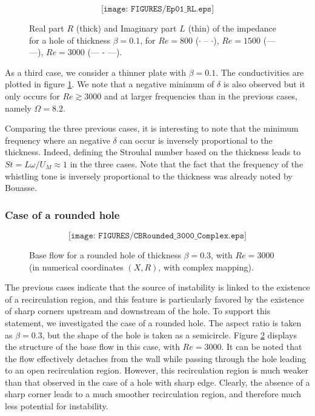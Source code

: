 \documentclass{jfm}
\begin{document}
\begin{figure}
$$
\texttt{[image: FIGURES/Ep01\_RL.eps]}
$$
\caption{ Real part $R$ (thick) and Imaginary part $L$ (thin) of the impedance
for a hole of thickness $\beta = 0.1$, for $Re = 800$ ($\cdot$ -- $\cdot$), 
$Re = 1500$ (---  ---), $Re = 3000$ (--- - ---).
}
\label{fig:Cond01}
\end{figure}



As a third case, we consider a thinner plate with $\beta = 0.1$. The conductivities are plotted in figure 
\ref{fig:Cond01}. We note that a negative minimum of $\delta$ is also observed but it only occurs for 
$Re \gtrsim 3000$ and at larger frequencies than in the previous cases, namely $\Omega = 8.2$.

Comparing the three previous cases, it is interesting to note that the minimum frequency where an negative $\delta$ can occur is inversely proportional to the thickness. Indeed, defining the Strouhal number based on the thickness
leads to $St = L \omega /U_M \approx 1 $  in the three cases. 
Note that the fact that the frequency of the whistling tone is inversely proportional to the thickness was already noted by Bouasse.


\subsubsection{Case of a rounded hole}




\begin{figure}
$$
\texttt{[image: FIGURES/CBRounded\_3000\_Complex.eps]}
$$
\caption{Base flow for a rounded hole of thickness $\beta = 0.3$, with $Re = 3000$ 
(in numerical coordinates $(X,R)$, with complex mapping). 
}
\label{fig:chbase_C}
\end{figure}



The previous cases indicate that the source of instability is linked to the existence of a recirculation region, and this feature is particularly favored by the existence of sharp corners upstream and downstream of the hole. To support this statement, we investigated the case of a rounded hole. The aspect ratio is taken as $\beta=0.3$, but 
the shape of the hole is taken as a semicircle. Figure \ref{fig:chbase_C} displays the structure of the base flow in this case, with $Re = 3000$. It can be noted that the flow effectively detaches from the wall while passing through the hole leading to an open recirculation region. However, this recirculation region is much weaker than that observed in the case of a hole with sharp edge. Clearly, the absence of a sharp corner leads to a much smoother recirculation region, and therefore much less potential for instability.
\end{document}
